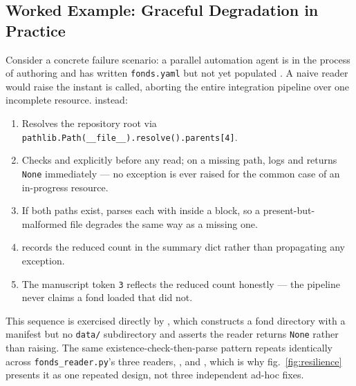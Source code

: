 \documentclass[
]{article}
\newcounter{none} %
\providecommand{\tightlist}{%
  \setlength{\itemsep}{0pt}\setlength{\parskip}{0pt}}
\begin{document}
\subsection{Worked Example: Graceful Degradation in
Practice}\label{worked-example-graceful-degradation-in-practice}

Consider a concrete failure scenario: a parallel automation agent is in
the process of authoring 
and has written \texttt{fonds.yaml} but not yet populated
. A naive reader would raise
 the instant 
is called, aborting the entire integration pipeline over one incomplete
resource.  instead:

\begin{enumerate}
\def\labelenumi{\arabic{enumi}.}
\tightlist
\item
  Resolves the repository root via
  \texttt{pathlib.Path(\_\_file\_\_).resolve().parents{[}4{]}}.
\item
  Checks  and
   explicitly before any read; on a
  missing path, logs
   and
  returns \texttt{None} immediately --- no exception is ever raised for
  the common case of an in-progress resource.
\item
  If both paths exist, parses each with 
  inside a
  block, so a present-but-malformed file degrades the same way as a
  missing one.
\item
   records the reduced count in the
  summary dict rather than propagating any exception.
\item
  The manuscript token \texttt{3} reflects the reduced count honestly
  --- the pipeline never claims a fond loaded that did not.
\end{enumerate}

This sequence is exercised directly by
,
which constructs a fond directory with a manifest but no \texttt{data/}
subdirectory and asserts the reader returns \texttt{None} rather than
raising. The same existence-check-then-parse pattern repeats identically
across \texttt{fonds\_reader.py}'s three readers,
, and , which is why
fig.~\ref{fig:resilience} presents it as one repeated design, not three
independent ad-hoc fixes.
\end{document}
